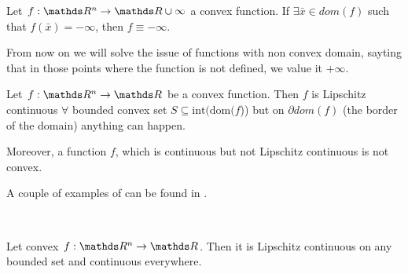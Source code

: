 \documentclass[computationalMathematics.tex]{subfiles}
\begin{document}
\begin{proposition}
  Let $f: \R^n \to \R \cup {\infty}$ a convex function. If $\exists \bar{x} \in dom(f)$ such that $f(\bar{x}) = - \infty$, then $f \equiv - \infty$. 
\end{proposition}

From now on we will solve the issue of functions with non convex domain, sayting that in those points where the function is not defined, we value it $+ \infty$.

\begin{proposition}\label{prop:11ott_1}
  Let $f: \R^n \to \R$ be a convex function. Then $f$ is Lipschitz continuous $\forall$ bounded convex set $S \subseteq \text{int(dom(}f$)) but on $\partial dom(f)$ (the border of the domain) anything can happen.

  Moreover, a function $f$, which is continuous but not Lipschitz continuous is not convex.
\end{proposition}

A couple of examples of  can be found in .

\begin{figure}[h]
  \centering
  \hspace{0.5cm}
  \\
  \caption{}\label{fig:11ott_2}
\end{figure}

\begin{proposition}
Let convex $f: \R^n \to \R$. Then it is Lipschitz continuous on any bounded set and continuous everywhere.
\end{proposition}
\end{document}
